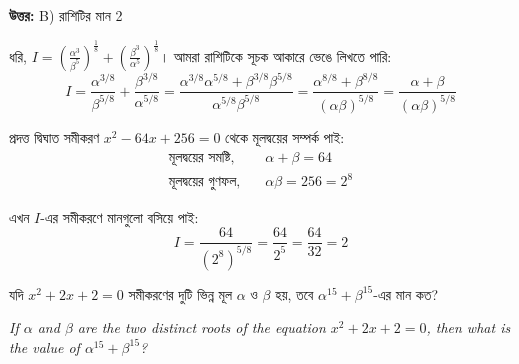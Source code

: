 \documentclass[12pt, a4paper]{article}
\begin{document}
\vspace{0.5em}
\begin{tcolorbox}[answerbox]
    \textbf{\color{success} উত্তর:} B) রাশিটির মান 2
\end{tcolorbox}
\vspace{1em}

\begin{tcolorbox}[solutionbox={সমাধান (Solution)}]
    \noindent
    ধরি, $I = \left(\frac{\alpha^3}{\beta^5}\right)^{\frac{1}{8}} + \left(\frac{\beta^3}{\alpha^5}\right)^{\frac{1}{8}}$। আমরা রাশিটিকে সূচক আকারে ভেঙে লিখতে পারি:
    \[ I = \frac{\alpha^{3/8}}{\beta^{5/8}} + \frac{\beta^{3/8}}{\alpha^{5/8}} = \frac{\alpha^{3/8}\alpha^{5/8} + \beta^{3/8}\beta^{5/8}}{\alpha^{5/8}\beta^{5/8}} = \frac{\alpha^{8/8} + \beta^{8/8}}{(\alpha\beta)^{5/8}} = \frac{\alpha+\beta}{(\alpha\beta)^{5/8}} \]
    
    \vspace{0.5em}
    প্রদত্ত দ্বিঘাত সমীকরণ $x^2 - 64x + 256 = 0$ থেকে মূলদ্বয়ের সম্পর্ক পাই:
    \begin{align*}
        \text{মূলদ্বয়ের সমষ্টি,} &\quad \alpha+\beta = 64 \\
        \text{মূলদ্বয়ের গুণফল,} &\quad \alpha\beta = 256 = 2^8
    \end{align*}
    
    \vspace{0.5em}
    এখন $I$-এর সমীকরণে মানগুলো বসিয়ে পাই:
    \[ I = \frac{64}{(2^8)^{5/8}} = \frac{64}{2^5} = \frac{64}{32} = 2 \]
\end{tcolorbox}

\begin{tcolorbox}[questionbox={প্রশ্ন (Question) 31}]
    \noindent
    যদি $x^2 + 2x + 2 = 0$ সমীকরণের দুটি ভিন্ন মূল $\alpha$ ও $\beta$ হয়, তবে $\alpha^{15} + \beta^{15}$-এর মান কত?
    
    \vspace{0.8em}
    \begin{english}
    \noindent\textit{\color{darkgray}
    If $\alpha$ and $\beta$ are the two distinct roots of the equation $x^2 + 2x + 2 = 0$, then what is the value of $\alpha^{15} + \beta^{15}$?
    }
    \end{english}
\end{tcolorbox}
\end{document}
